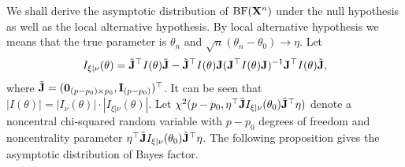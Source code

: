 \documentclass[11pt]{article}
\theoremstyle{plain}
\theoremstyle{definition}
\theoremstyle{remark}
\begin{document}
We shall derive the asymptotic distribution of $\text{BF}(\mathbf{X}^n)$ under the null hypothesis as well as the local alternative hypothesis.
By local alternative hypothesis we means that the true parameter is $\theta_n$ and $\sqrt{n}(\theta_n-\theta_0)\to \eta$.
Let
\begin{align*}
    I_{\xi|\nu}(\theta) = 
    \tilde {\mathbf{J}} ^\top  I(\theta) \tilde {\mathbf{J}}
    -
    \tilde {\mathbf{J}} ^\top  I(\theta) \mathbf{J}
    (  \mathbf{J} ^\top  I(\theta) \mathbf{J} )^{-1}
    \mathbf{J} ^\top  I(\theta) \tilde {\mathbf{J}}
    ,
\end{align*}
where
$\tilde{\mathbf{J}}=(\mathbf {0}_{ (p- p_0) \times p_0 },\mathbf{I}_{(p-p_0)})^\top $.
It can be seen that $|I(\theta)| = |I_{\nu}(\theta)|\cdot |I_{\xi | \nu}(\theta )|$.
Let $\chi^2(p-p_0,\eta^\top\tilde {\mathbf{J}} I_{\xi|\nu}(\theta_0) \tilde{\mathbf{J}}^\top\eta )$ denote a noncentral chi-squared random variable with $p-p_0$ degrees of freedom and noncentrality parameter $\eta^\top\tilde {\mathbf{J}} I_{\xi|\nu}(\theta_0) \tilde{\mathbf{J}}^\top\eta$.
The following proposition gives the asymptotic distribution of Bayes factor.
\end{document}
